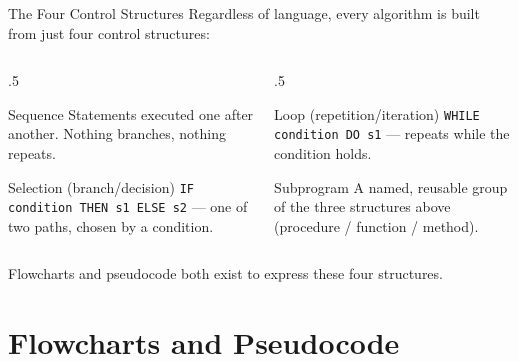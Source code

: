 \documentclass[9pt,aspectratio=169,xcolor=table]{beamer}
\begin{document}
\begin{frame}{The Four Control Structures}
    \leavevmode
    \small
    Regardless of language, every algorithm is built from just four
    control structures:

    \vspace{2mm}
    \begin{columns}[t]
        \begin{column}{.5\textwidth}
            \begin{block}{Sequence}
                \scriptsize Statements executed one after another.
                Nothing branches, nothing repeats.
            \end{block}
            \vspace{2mm}
            \begin{block}{Selection (branch/decision)}
                \scriptsize \texttt{IF condition THEN s1 ELSE s2} ---
                one of two paths, chosen by a condition.
            \end{block}
        \end{column}
        \begin{column}{.5\textwidth}
            \begin{block}{Loop (repetition/iteration)}
                \scriptsize \texttt{WHILE condition DO s1} --- repeats
                while the condition holds.
            \end{block}
            \vspace{2mm}
            \begin{block}{Subprogram}
                \scriptsize A named, reusable group of the three
                structures above (procedure / function / method).
            \end{block}
        \end{column}
    \end{columns}

    \vspace{3mm}
    {\scriptsize Flowcharts and pseudocode both exist to express these
    four structures.}
\end{frame}

\section{Flowcharts and Pseudocode}
\end{document}
